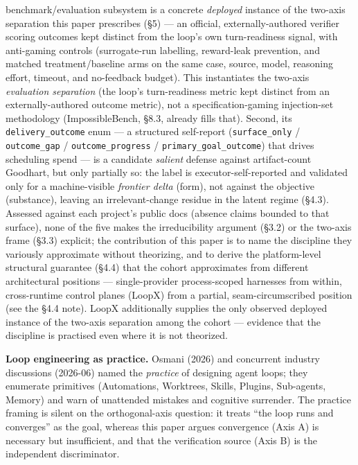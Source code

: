 \documentclass[
  11pt,
]{article}
\begin{document}
benchmark/evaluation subsystem is a concrete \emph{deployed} instance of
the two-axis separation this paper prescribes (§5) --- an official,
externally-authored verifier scoring outcomes kept distinct from the
loop's own turn-readiness signal, with anti-gaming controls
(surrogate-run labelling, reward-leak prevention, and matched
treatment/baseline arms on the same case, source, model, reasoning
effort, timeout, and no-feedback budget). This instantiates the two-axis
\emph{evaluation separation} (the loop's turn-readiness metric kept
distinct from an externally-authored outcome metric), not a
specification-gaming injection-set methodology (ImpossibleBench, §8.3,
already fills that). Second, its \texttt{delivery\_outcome} enum --- a
structured self-report (\texttt{surface\_only} / \texttt{outcome\_gap} /
\texttt{outcome\_progress} / \texttt{primary\_goal\_outcome}) that
drives scheduling spend --- is a candidate \emph{salient} defense
against artifact-count Goodhart, but only partially so: the label is
executor-self-reported and validated only for a machine-visible
\emph{frontier delta} (form), not against the objective (substance),
leaving an irrelevant-change residue in the latent regime (§4.3).
Assessed against each project's public docs (absence claims bounded to
that surface), none of the five makes the irreducibility argument (§3.2)
or the two-axis frame (§3.3) explicit; the contribution of this paper is
to name the discipline they variously approximate without theorizing,
and to derive the platform-level structural guarantee (§4.4) that the
cohort approximates from different architectural positions ---
single-provider process-scoped harnesses from within, cross-runtime
control planes (LoopX) from a partial, seam-circumscribed position (see
the §4.4 note). LoopX additionally supplies the only observed deployed
instance of the two-axis separation among the cohort --- evidence that
the discipline is practised even where it is not theorized.

\textbf{Loop engineering as practice.} Osmani (2026) and concurrent
industry discussions (2026-06) named the \emph{practice} of designing
agent loops; they enumerate primitives (Automations, Worktrees, Skills,
Plugins, Sub-agents, Memory) and warn of unattended mistakes and
cognitive surrender. The practice framing is silent on the
orthogonal-axis question: it treats ``the loop runs and converges'' as
the goal, whereas this paper argues convergence (Axis A) is necessary
but insufficient, and that the verification source (Axis B) is the
independent discriminator.
\end{document}
